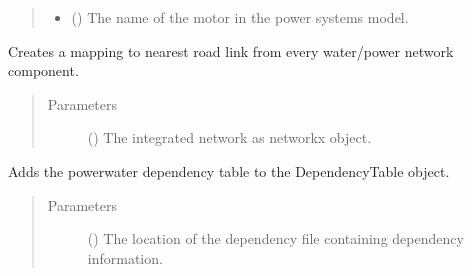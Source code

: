 \documentclass[letterpaper,10pt,english]{sphinxmanual}
\begin{document}
\begin{fulllineitems}
\begin{fulllineitems}
\begin{quote}
\begin{description}
\begin{itemize}
\item {} 
\sphinxAtStartPar
{} () \textendash{} The name of the motor in the power systems model.

\end{itemize}

\end{description}\end{quote}

\end{fulllineitems}


\begin{fulllineitems}
\label{\detokenize{apidoc:dreaminsg_integrated_model.src.network_sim_models.interdependencies.DependencyTable.add_transpo_access}}
\sphinxAtStartPar
Creates a mapping to nearest road link from every water/power network component.
\begin{quote}\begin{description}
\item[{Parameters}] \leavevmode
\sphinxAtStartPar
{} (\sphinxstyleliteralemphasis{\sphinxupquote{{[}}}\sphinxstyleliteralemphasis{\sphinxupquote{{]}}}) \textendash{} The integrated network as networkx object.

\end{description}\end{quote}

\end{fulllineitems}


\begin{fulllineitems}
\label{\detokenize{apidoc:dreaminsg_integrated_model.src.network_sim_models.interdependencies.DependencyTable.build_power_water_dependencies}}
\sphinxAtStartPar
Adds the power\sphinxhyphen{}water dependency table to the DependencyTable object.
\begin{quote}\begin{description}
\item[{Parameters}] \leavevmode
\sphinxAtStartPar
{} () \textendash{} The location of the dependency file containing dependency information.


\end{description}
\end{quote}
\end{fulllineitems}
\end{fulllineitems}
\end{document}
